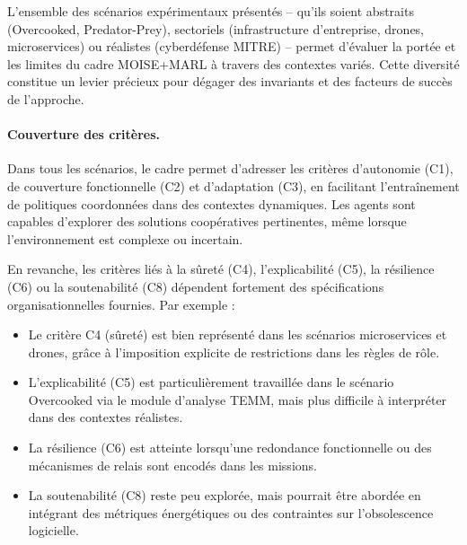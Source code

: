 L’ensemble des scénarios expérimentaux présentés -- qu’ils soient abstraits (Overcooked, Predator-Prey), sectoriels (infrastructure d’entreprise, drones, microservices) ou réalistes (cyberdéfense MITRE) -- permet d’évaluer la portée et les limites du cadre MOISE+MARL à travers des contextes variés. Cette diversité constitue un levier précieux pour dégager des invariants et des facteurs de succès de l’approche.

\paragraph{Couverture des critères.} Dans tous les scénarios, le cadre permet d’adresser les critères d’autonomie (C1), de couverture fonctionnelle (C2) et d’adaptation (C3), en facilitant l’entraînement de politiques coordonnées dans des contextes dynamiques. Les agents sont capables d’explorer des solutions coopératives pertinentes, même lorsque l’environnement est complexe ou incertain.

En revanche, les critères liés à la sûreté (C4), l’explicabilité (C5), la résilience (C6) ou la soutenabilité (C8) dépendent fortement des spécifications organisationnelles fournies. Par exemple :
\begin{itemize}
  \item Le critère C4 (sûreté) est bien représenté dans les scénarios microservices et drones, grâce à l’imposition explicite de restrictions dans les règles de rôle.
  \item L’explicabilité (C5) est particulièrement travaillée dans le scénario Overcooked via le module d’analyse TEMM, mais plus difficile à interpréter dans des contextes réalistes.
  \item La résilience (C6) est atteinte lorsqu’une redondance fonctionnelle ou des mécanismes de relais sont encodés dans les missions.
  \item La soutenabilité (C8) reste peu explorée, mais pourrait être abordée en intégrant des métriques énergétiques ou des contraintes sur l’obsolescence logicielle.
\end{itemize}

